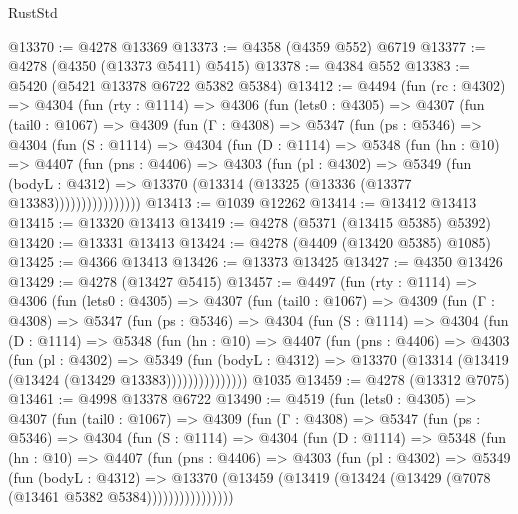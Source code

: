 \begin{lexlean}{RustStd}
\begin{coremodule}
@13370 := @4278 @13369
@13373 := @4358 (@4359 @552) @6719
@13377 := @4278 (@4350 (@13373 @5411) @5415)
@13378 := @4384 @552
@13383 := @5420 (@5421 @13378 @6722 @5382 @5384)
@13412 := @4494
    (fun (rc : @4302) =>
    @4304
      (fun (rty : @1114) =>
      @4306
        (fun (lets0 : @4305) =>
        @4307
          (fun (tail0 : @1067) =>
          @4309
            (fun (Γ : @4308) =>
            @5347
              (fun (ps : @5346) =>
              @4304
                (fun (S : @1114) =>
                @4304
                  (fun (D : @1114) =>
                  @5348
                    (fun (hn : @10) =>
                    @4407
                      (fun (pns : @4406) =>
                      @4303
                        (fun (pl : @4302) =>
                        @5349
                          (fun (bodyL : @4312) =>
                          @13370 (@13314 (@13325 (@13336 (@13377 @13383))))))))))))))))
@13413 := @1039 @12262
@13414 := @13412 @13413
@13415 := @13320 @13413
@13419 := @4278 (@5371 (@13415 @5385) @5392)
@13420 := @13331 @13413
@13424 := @4278 (@4409 (@13420 @5385) @1085)
@13425 := @4366 @13413
@13426 := @13373 @13425
@13427 := @4350 @13426
@13429 := @4278 (@13427 @5415)
@13457 := @4497
    (fun (rty : @1114) =>
    @4306
      (fun (lets0 : @4305) =>
      @4307
        (fun (tail0 : @1067) =>
        @4309
          (fun (Γ : @4308) =>
          @5347
            (fun (ps : @5346) =>
            @4304
              (fun (S : @1114) =>
              @4304
                (fun (D : @1114) =>
                @5348
                  (fun (hn : @10) =>
                  @4407
                    (fun (pns : @4406) =>
                    @4303
                      (fun (pl : @4302) =>
                      @5349
                        (fun (bodyL : @4312) =>
                        @13370 (@13314 (@13419 (@13424 (@13429 @13383)))))))))))))))
    @1035
@13459 := @4278 (@13312 @7075)
@13461 := @4998 @13378 @6722
@13490 := @4519
    (fun (lets0 : @4305) =>
    @4307
      (fun (tail0 : @1067) =>
      @4309
        (fun (Γ : @4308) =>
        @5347
          (fun (ps : @5346) =>
          @4304
            (fun (S : @1114) =>
            @4304
              (fun (D : @1114) =>
              @5348
                (fun (hn : @10) =>
                @4407
                  (fun (pns : @4406) =>
                  @4303
                    (fun (pl : @4302) =>
                    @5349
                      (fun (bodyL : @4312) =>
                      @13370
                        (@13459 (@13419 (@13424 (@13429 (@7078 (@13461 @5382 @5384))))))))))))))))

\end{coremodule}
\end{lexlean}
